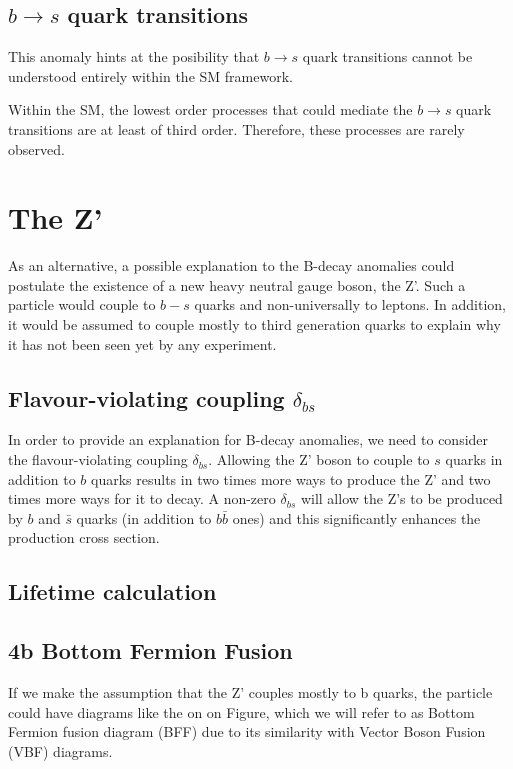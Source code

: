 \subsection{$b\rightarrow s$ quark transitions}
This anomaly hints at the posibility that $b\rightarrow s$ quark transitions cannot be understood entirely within the SM framework. 

Within the SM, the lowest order processes that could mediate the $b\rightarrow s$ quark transitions are at least of third order. Therefore, these processes are rarely observed.
\section{The Z'}
As an alternative, a possible explanation to the B-decay anomalies could postulate the existence of a new heavy neutral gauge boson, the Z'. Such a particle would couple to $b-s$ quarks and non-universally to leptons. In addition, it would be assumed to couple mostly to third generation quarks to explain why it has not been seen yet by any experiment.
\subsection{Flavour-violating coupling $\delta_{bs}$}
In order to provide an explanation for B-decay anomalies, we need to consider the flavour-violating coupling $\delta_{bs}$. Allowing the Z' boson to couple to $s$ quarks in addition to $b$ quarks results in two times more ways to produce the Z' and two times more ways for it to decay. A non-zero $\delta_{bs}$ will allow the Z's to be produced by $b$ and $\bar{s}$ quarks (in addition to $b\bar{b}$ ones) and this significantly enhances the production cross section.

\subsection{Lifetime calculation}
\subsection{4b Bottom Fermion Fusion}
If we make the assumption that the Z' couples mostly to b quarks, the particle could have diagrams like the on on Figure, which we will refer to as Bottom Fermion fusion diagram (BFF) due to its similarity with Vector Boson Fusion (VBF) diagrams.